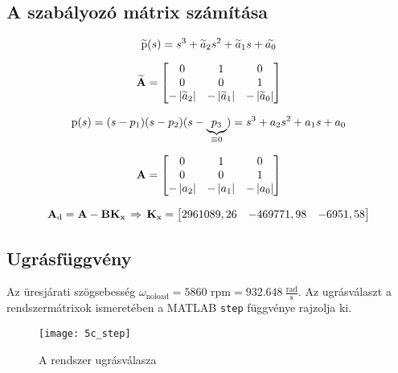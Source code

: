   
\subsection{A szabályozó mátrix számítása}

\begin{equation}
	\widetilde{\mathrm{p}}(s) = s^3 + \widetilde{a}_2s^2 + \widetilde{a}_1s + \widetilde{a_0}
\end{equation}

\begin{equation}
	\widetilde{\boldsymbol{\mathrm{A}}} = \begin{bmatrix}0&1&0\\0&0&1\\-\left\lvert \widetilde{a}_2 \right\rvert&-\left\lvert \widetilde{a}_1 \right\rvert&-\left\lvert \widetilde{a}_0 \right\rvert\end{bmatrix}
\end{equation}

\begin{equation}
	\mathrm{p}(s) = (s-p_1)(s-p_2)(s-\underbrace{p_3}_{\equiv0}) = s^3 + a_2s^2 + a_1s + a_0
\end{equation}

\begin{equation}
	\boldsymbol{\mathrm{A}} = \begin{bmatrix}0&1&0\\0&0&1\\-\left\lvert a_2 \right\rvert&-\left\lvert a_1 \right\rvert&-\left\lvert a_0 \right\rvert\end{bmatrix}
\end{equation}

\begin{equation}
	\boldsymbol{\mathrm{A}}_\text{d} = \boldsymbol{\mathrm{A}} - \boldsymbol{\mathrm{B}}\boldsymbol{\mathrm{K}}_\text{x}\,\Rightarrow\,\boldsymbol{\mathrm{K}}_\text{x} = \begin{bmatrix} 2961089,26& -469771,98& -6951,58\end{bmatrix}
\end{equation}


\subsection{Ugrásfüggvény}

Az üresjárati szögsebesség $\omega_\text{noload} = 5860\text{ rpm} = 932.648~\frac{\text{rad}}{\text{s}}$. Az ugrásválaszt a rendszermátrixok ismeretében a MATLAB \verb|step| függvénye rajzolja ki.

\begin{figure}[H]
	\centering
	\texttt{[image: 5c\_step]}
	\caption{A rendszer ugrásválasza}
	\label{fig:5c_step}
\end{figure}



